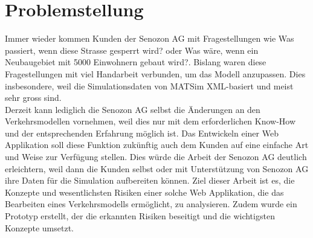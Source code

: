 \chapter{Problemstellung}
Immer wieder kommen Kunden der Senozon AG mit Fragestellungen wie \glqq{}Was passiert, wenn diese Strasse gesperrt wird?\grqq{} oder \glqq{}Was wäre, wenn  ein Neubaugebiet mit 5000 Einwohnern gebaut wird?\grqq{}. Bislang waren diese Fragestellungen mit viel Handarbeit verbunden, um das Modell anzupassen. Dies insbesondere, weil die Simulationsdaten von MATSim XML-basiert und meist sehr gross sind.\\
Derzeit kann lediglich die Senozon AG selbst die Änderungen an den Verkehrsmodellen vornehmen, weil dies nur mit dem erforderlichen Know-How und der entsprechenden Erfahrung möglich ist. Das Entwickeln einer Web Applikation soll diese Funktion zukünftig auch dem Kunden auf eine einfache Art und Weise zur Verfügung stellen. Dies würde die Arbeit der Senozon AG deutlich erleichtern, weil dann die Kunden selbst oder mit Unterstützung von Senozon AG ihre Daten für die Simulation aufbereiten können. Ziel dieser Arbeit ist es, die Konzepte und wesentlichsten Risiken einer solche Web Applikation, die das Bearbeiten eines Verkehrsmodells ermöglicht, zu analysieren. Zudem wurde ein Prototyp erstellt, der die erkannten Risiken beseitigt und die wichtigsten Konzepte umsetzt.
